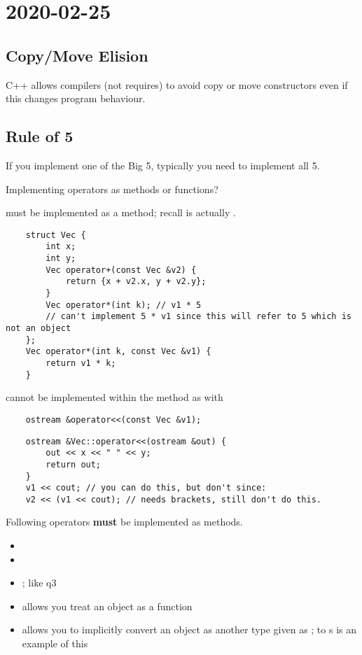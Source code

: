 \section{2020-02-25}
\subsection{Copy/Move Elision}
C++ allows compilers (not requires) to avoid copy or move constructors
even if this changes program behaviour.

\subsection{Rule of 5}
If you implement one of the Big 5, typically you need to implement
all 5.

Implementing operators as methods or functions?

 must be implemented as a method; recall 
is actually .

\begin{lstlisting}
    struct Vec {
        int x;
        int y;
        Vec operator+(const Vec &v2) {
            return {x + v2.x, y + v2.y};
        }
        Vec operator*(int k); // v1 * 5
        // can't implement 5 * v1 since this will refer to 5 which is not an object
    };
    Vec operator*(int k, const Vec &v1) {
        return v1 * k;
    }
\end{lstlisting}
 \textrightarrow{} cannot be implemented within the method as with
\begin{lstlisting}
    ostream &operator<<(const Vec &v1);
\end{lstlisting}
\begin{lstlisting}
    ostream &Vec::operator<<(ostream &out) {
        out << x << " " << y;
        return out;
    }
    v1 << cout; // you can do this, but don't since:
    v2 << (v1 << cout); // needs brackets, still don't do this.
\end{lstlisting}

Following operators \textbf{must} be implemented as methods.
\begin{itemize}
    \item {}
    \item {}
    \item {}; like q3
    \item {} \textrightarrow{} allows you treat an object as a function
    \item {} \textrightarrow{} allows you to implicitly convert
          an object as another type given as ;  to s
          is an example of this
\end{itemize}

